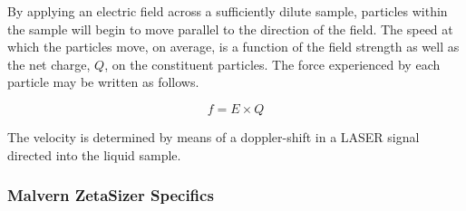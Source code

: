 By applying an electric field across a sufficiently dilute sample, particles within the sample will begin to move parallel to the direction of the field. The speed at which the particles move, on average, is a function of the field strength as well as the net charge, $Q$, on the constituent particles. The force experienced by each particle may be written as follows.

\begin{equation}
\mathit{f} = E \times Q
\end{equation}



The velocity is determined by means of a doppler-shift in a LASER signal directed into the liquid sample.

\subsubsection{Malvern ZetaSizer Specifics}








